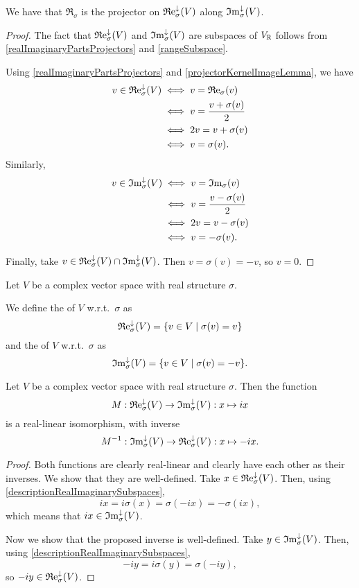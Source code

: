 We have that $\Re_\sigma$ is the projector on $\operatorname{\mathfrak{R}e}_\sigma^\downarrow(V)$ along $\operatorname{\mathfrak{I}m}_\sigma^\downarrow(V)$.
\begin{proof}
The fact that $\operatorname{\mathfrak{R}e}^\downarrow_\sigma(V)$ and $\operatorname{\mathfrak{I}m}^\downarrow_\sigma(V)$ are subspaces of $V_{\mathbb{R}}$ follows from \ref{realImaginaryPartsProjectors} and \ref{rangeSubspace}.

Using \ref{realImaginaryPartsProjectors} and \ref{projectorKernelImageLemma}, we have
\begin{align*}
v \in \operatorname{\mathfrak{R}e}^\downarrow_\sigma(V) &\iff v = \operatorname{\mathfrak{R}e}_\sigma(v) \\
&\iff v = \frac{v+\sigma(v)}{2} \\
&\iff 2v = v+\sigma(v) \\
&\iff v = \sigma(v).
\end{align*}
Similarly,
\begin{align*}
v \in \operatorname{\mathfrak{I}m}^\downarrow_\sigma(V) &\iff v = \operatorname{\mathfrak{I}m}_\sigma(v) \\
&\iff v = \frac{v-\sigma(v)}{2} \\
&\iff 2v = v-\sigma(v) \\
&\iff v = -\sigma(v).
\end{align*}

Finally, take $v\in \operatorname{\mathfrak{R}e}^\downarrow_\sigma(V) \cap \operatorname{\mathfrak{I}m}^\downarrow_\sigma(V)$. Then $v = \sigma(v) = -v$, so $v = 0$.
\end{proof}

\begin{definition}
Let $V$ be a complex vector space with real structure $\sigma$.

We define the  of $V$ w.r.t.\ $\sigma$ as
\[ \Re_\sigma^\imf(V) = \setbuilder{v\in V}{\sigma(v) = v} \]
and the  of $V$ w.r.t.\ $\sigma$ as
\[ \Im_\sigma^\imf(V) = \setbuilder{v\in V}{\sigma(v) = -v}. \]
\end{definition}

\begin{lemma} \label{realImaginarySubspacesIsomorphic}
Let $V$ be a complex vector space with real structure $\sigma$. Then the function
\[ M: \operatorname{\mathfrak{R}e}_\sigma^\downarrow(V) \to \operatorname{\mathfrak{I}m}_\sigma^\downarrow(V): x \mapsto ix \]
is a real-linear isomorphism, with inverse
\[ M^{-1}: \operatorname{\mathfrak{I}m}_\sigma^\downarrow(V) \to \operatorname{\mathfrak{R}e}_\sigma^\downarrow(V): x \mapsto -ix. \]
\end{lemma}
\begin{proof}
Both functions are clearly real-linear and clearly have each other as their inverses. We show that they are well-defined. Take $x\in \operatorname{\mathfrak{R}e}_\sigma^\downarrow(V)$. Then, using \ref{descriptionRealImaginarySubspaces},
\[ ix = i\sigma(x) = \sigma(-ix) = -\sigma(ix), \]
which means that $ix\in \operatorname{\mathfrak{I}m}_\sigma^\downarrow(V)$.

Now we show that the proposed inverse is well-defined. Take $y\in \operatorname{\mathfrak{I}m}_\sigma^\downarrow(V)$. Then, using \ref{descriptionRealImaginarySubspaces},
\[ -iy = i\sigma(y) = \sigma(-iy), \]
so $-iy \in \operatorname{\mathfrak{R}e}_\sigma^\downarrow(V)$.
\end{proof}

